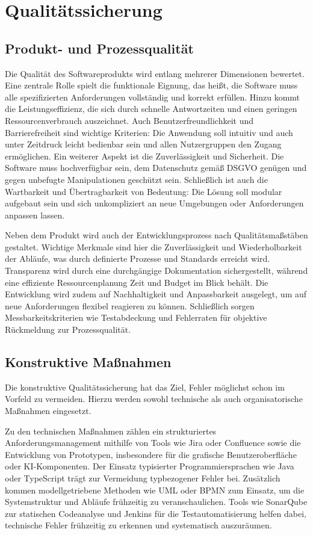 \chapter{Qualitätssicherung}
\label{sec:qualitaetssicherung}
\section{Produkt- und Prozessqualität}

Die Qualität des Softwareprodukts wird entlang mehrerer Dimensionen bewertet. Eine zentrale Rolle spielt die funktionale Eignung, das heißt, die Software muss alle spezifizierten Anforderungen vollständig und korrekt erfüllen. Hinzu kommt die Leistungseffizienz, die sich durch schnelle Antwortzeiten und einen geringen Ressourcenverbrauch auszeichnet. Auch Benutzerfreundlichkeit und Barrierefreiheit sind wichtige Kriterien: Die Anwendung soll intuitiv und auch unter Zeitdruck leicht bedienbar sein und allen Nutzergruppen den Zugang ermöglichen. Ein weiterer Aspekt ist die Zuverlässigkeit und Sicherheit. Die Software muss hochverfügbar sein, dem Datenschutz gemäß DSGVO genügen und gegen unbefugte Manipulationen geschützt sein. Schließlich ist auch die Wartbarkeit und Übertragbarkeit von Bedeutung: Die Lösung soll modular aufgebaut sein und sich unkompliziert an neue Umgebungen oder Anforderungen anpassen lassen.

Neben dem Produkt wird auch der Entwicklungsprozess nach Qualitätsmaßstäben gestaltet. Wichtige Merkmale sind hier die Zuverlässigkeit und Wiederholbarkeit der Abläufe, was durch definierte Prozesse und Standards erreicht wird. Transparenz wird durch eine durchgängige Dokumentation sichergestellt, während eine effiziente Ressourcenplanung Zeit und Budget im Blick behält. Die Entwicklung wird zudem auf Nachhaltigkeit und Anpassbarkeit ausgelegt, um auf neue Anforderungen flexibel reagieren zu können. Schließlich sorgen Messbarkeitskriterien wie Testabdeckung und Fehlerraten für objektive Rückmeldung zur Prozessqualität.

\section{Konstruktive Maßnahmen}

Die konstruktive Qualitätssicherung hat das Ziel, Fehler möglichst schon im Vorfeld zu vermeiden. Hierzu werden sowohl technische als auch organisatorische Maßnahmen eingesetzt.

Zu den technischen Maßnahmen zählen ein strukturiertes Anforderungsmanagement mithilfe von Tools wie Jira oder Confluence sowie die Entwicklung von Prototypen, insbesondere für die grafische Benutzeroberfläche oder KI-Komponenten. Der Einsatz typisierter Programmiersprachen wie Java oder TypeScript trägt zur Vermeidung typbezogener Fehler bei. Zusätzlich kommen modellgetriebene Methoden wie UML oder BPMN zum Einsatz, um die Systemstruktur und Abläufe frühzeitig zu veranschaulichen. Tools wie SonarQube zur statischen Codeanalyse und Jenkins für die Testautomatisierung helfen dabei, technische Fehler frühzeitig zu erkennen und systematisch auszuräumen.

